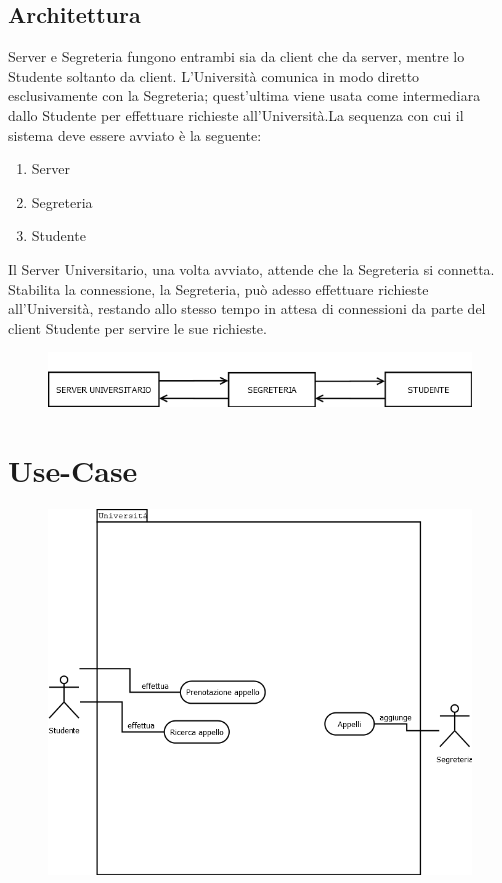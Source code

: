 \documentclass[12pt]{article}
\begin{document}
\subsection{Architettura}
Server e Segreteria fungono entrambi sia da client che da server, mentre lo Studente soltanto da client.\newline\newline
L'Università comunica in modo diretto esclusivamente con la Segreteria; quest'ultima viene usata come intermediara dallo Studente per effettuare richieste all'Università.\newline\newline La sequenza con cui il sistema deve essere avviato è la seguente:
\begin{enumerate}
    \item Server
    \item Segreteria
    \item Studente\newline
\end{enumerate}
Il Server Universitario, una volta avviato, attende che la Segreteria si connetta. Stabilita la connessione, la Segreteria, può adesso effettuare richieste all'Università, restando allo stesso tempo in attesa di connessioni da parte del client Studente per servire le sue richieste.

\begin{figure}[H]
\centering
\includegraphics[width=1.00\linewidth]{Schema.PNG}
\end{figure}

\section{Use-Case}

\begin{figure}[H]
\centering
\includegraphics[width=1.00\linewidth]{Use2.PNG}
\end{figure}
\end{document}

